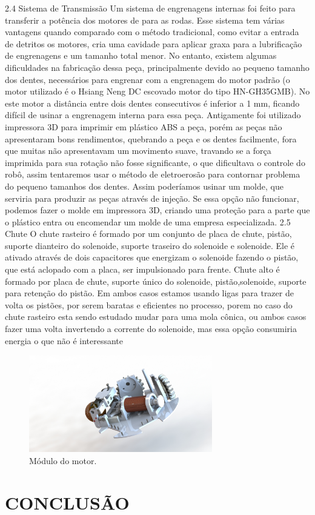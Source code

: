 \documentclass[letterpaper, 10 pt, conference]{ieeeconf}  %
\begin{document}
2.4 Sistema de Transmissão
Um sistema de engrenagens internas foi feito para transferir a potência dos motores de para
as rodas. Esse sistema tem várias vantagens quando comparado com o método tradicional, 
como evitar a entrada de detritos os motores, cria uma cavidade para aplicar graxa para a
lubrificação de engrenagens e um tamanho total menor.
No entanto, existem algumas dificuldades na fabricação dessa peça, principalmente devido ao
pequeno tamanho dos dentes, necessários para engrenar com a engrenagem do motor padrão
(o motor utilizado é o Hsiang Neng DC escovado motor do tipo HN-GH35GMB). No este motor
a distância entre dois dentes consecutivos é inferior a 1 mm, ficando difícil de usinar a
engrenagem interna para essa peça.
Antigamente foi utilizado impressora 3D para imprimir em plástico ABS a peça, porém as
peças não apresentaram bons rendimentos, quebrando a peça e os dentes facilmente, fora
que muitas não apresentavam um movimento suave, travando se a força imprimida para sua
rotação não fosse significante, o que dificultava o controle do robô, assim tentaremos usar o
método de eletroerosão para contornar problema do pequeno tamanhos dos dentes. Assim
poderíamos usinar um molde, que serviria para produzir as peças através de injeção.
Se essa opção não funcionar, podemos fazer o molde em impressora 3D, criando uma
proteção para a parte que o plástico entra ou encomendar um molde de uma empresa
especializada.
2.5 Chute
O chute rasteiro é formado por um conjunto de placa de chute, pistão, suporte dianteiro do
solenoide, suporte traseiro do solenoide e solenoide. Ele é ativado através de dois capacitores
que energizam o solenoide fazendo o pistão, que está aclopado com a placa, ser impulsionado
para frente.
Chute alto é formado por placa de chute, suporte único do solenoide, pistão,solenoide,
suporte para retenção do pistão.
Em ambos casos estamos usando ligas para trazer de volta os pistões, por serem baratas e
eficientes no processo, porem no caso do chute rasteiro esta sendo estudado mudar para uma
mola cônica, ou ambos casos fazer uma volta invertendo a corrente do solenoide, mas essa
opção consumiria energia o que não é interessante
\begin{figure}[thpb]	
	\centering
	\includegraphics[width=8cm]{img/mec11}
	\caption{Módulo do motor.}
	\label{img:modulomotor}
\end{figure}

\section{CONCLUSÃO}


\footnotesize		
\end{document}
